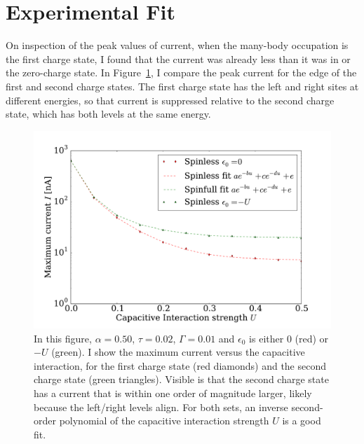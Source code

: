\clearpage\section{Experimental Fit}
\label{sec:perrin}
On inspection of the peak values of current, when the many-body occupation is the first charge state, I found that the current was already less than it was in \citet{perrinnano} or the zero-charge state. In Figure~\ref{fig:imax}, I compare the peak current for the edge of the first and second charge states. The first charge state has the left and right sites at different energies, so that current is suppressed relative to the second charge state, which has both levels at the same energy.
\begin{figure}[bt]
    \centering
    \includegraphics[height=.38\textheight]{pdf/canyouread.pdf}
    \caption{In this figure, $\alpha=0.50$, $\tau=0.02$, $\Gamma=0.01$ and $\epsilon_0$ is either $0$ (red) or $-U$ (green). I show the maximum current versus the capacitive interaction, for the first charge state (red diamonds) and the second charge state (green triangles). Visible is that the second charge state has a current that is within one order of magnitude larger, likely because the left/right levels align. For both sets, an inverse second-order polynomial of the capacitive interaction strength $U$ is a good fit.}
    \label{fig:imax}
\end{figure}

